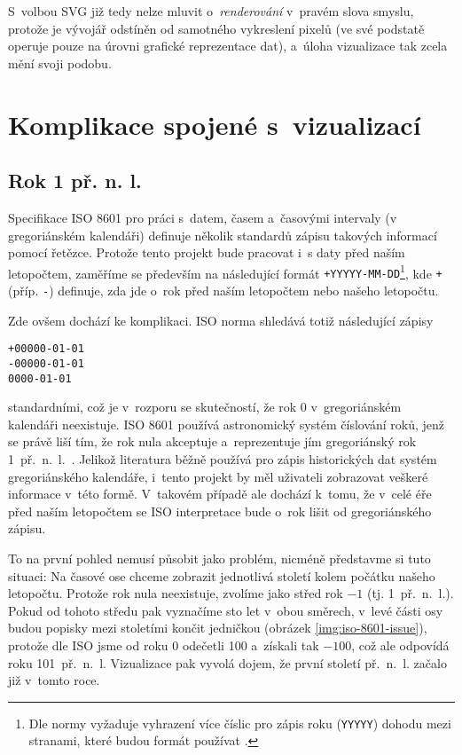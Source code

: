 	 S~volbou SVG již tedy nelze mluvit o~\emph{renderování} v~pravém slova smyslu, protože je vývojář odstíněn od samotného vykreslení pixelů (ve své podstatě operuje pouze na úrovni grafické reprezentace dat), a~úloha vizualizace tak zcela mění svoji podobu.
	
	\section{Komplikace spojené s~vizualizací}
		\label{komplikace-vizualizace}
		\subsection{Rok 1 př. n. l.}
		\label{1bc}
			Specifikace ISO 8601 \cite{iso-8601} pro práci s~datem, časem a~časovými intervaly (v grego\-riánském kalendáři) definuje několik standardů zápisu takových informací pomocí řetězce. Protože tento projekt bude pracovat i~s daty před naším letopočtem, zaměříme se pře\-devším na následující formát {\tt +YYYYY-MM-DD}\footnote{Dle normy vyžaduje vyhrazení více číslic pro zápis roku ({\tt YYYYY}) dohodu mezi stranami, které budou formát používat \cite{iso-8601}.}, kde {\tt +} (příp. {\tt -}) definuje, zda jde o~rok před naším letopočtem nebo našeho letopočtu.
			
			Zde ovšem dochází ke komplikaci. ISO norma shledává totiž následující zápisy
			\begin{verbatim}+00000-01-01
-00000-01-01
0000-01-01\end{verbatim}
			standardními, což je v~rozporu se skutečností, že rok 0 v~gregoriánském kalendáři neexistuje. ISO 8601 používá astronomický systém číslování roků, jenž se právě liší tím, že rok nula akceptuje a~reprezentuje jím gregoriánský rok 1~př.~n.~l.~\cite{iso-8601}. Jelikož literatura běžně používá pro zápis historických dat systém gregoriánského kalendáře, i~tento projekt by měl uživateli zobrazovat veškeré informace v~této formě. V~takovém případě ale dochází k~tomu, že v~celé éře před naším letopočtem se ISO interpretace bude o~rok lišit od gregoriánského zápisu.
			
			To na první pohled nemusí působit jako problém, nicméně představme si tuto situaci: Na časové ose chceme zobrazit jednotlivá století kolem počátku našeho letopočtu. Protože rok nula neexistuje, zvolíme jako střed rok $-1$ (tj. 1~př.~n.~l.). Pokud od tohoto středu pak vyznačíme sto let v~obou směrech, v~levé části osy budou popisky mezi stoletími končit jedničkou (obrázek \ref{img:iso-8601-issue}), protože dle ISO jsme od roku 0 odečetli 100 a~získali tak $-100$, což ale odpovídá roku 101~př.~n.~l. Vizualizace pak vyvolá dojem, že první století př.~n.~l. začalo již v~tomto roce.
			
